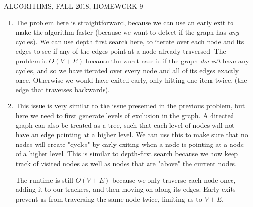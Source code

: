 \documentclass[12pt]{article}
\begin{document}
  
\pagestyle{empty}
 

\begin{center} ALGORITHMS,   FALL 2018, HOMEWORK 9
\end{center}

\begin{enumerate}

\item
    The problem here is straightforward, because we can use an early exit to make the algorithm faster (because we want to detect if the graph has \textit{any} cycles).
    We can use depth first search here, to iterate over each node and its edges to see if any of the edges point at a node already traversed.
    The problem is $O(V+E)$ because the worst case is if the graph \textit{doesn't} have any cycles, and so we have iterated over every node and all of its edges exactly once.
    Otherwise we would have exited early, only hitting one item twice. (the edge that traverses backwards).
    

\pagebreak

\item 
    
    This issue is very similar to the issue presented in the previous problem, but here we need to first generate levels of exclusion in the graph.
    A directed graph can also be treated as a tree, such that each level of nodes will not have an edge pointing at a higher level. We can use this to make sure that no nodes will create "cycles" by early exiting when a node 
    is pointing at a node of a higher level. This is similar to depth-first search because we now keep track of visited nodes as well as nodes that are "above" the current nodes.

    The runtime is still $O(V+E)$ because we only traverse each node once, adding it to our trackers, and then moving on along its edges. Early exits prevent us from traversing the same node twice, limiting us to $V+E$.


\end{enumerate}
\end{document}
